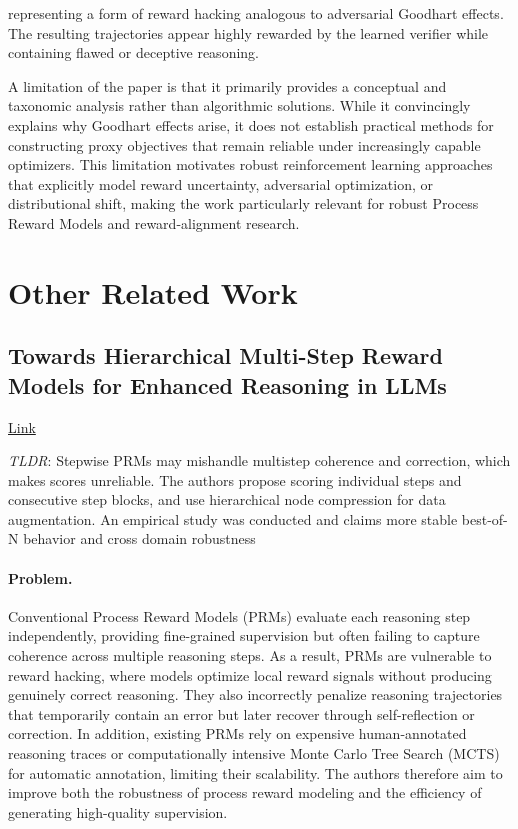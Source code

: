 \documentclass[11pt]{article}
\begin{document}
representing a form of reward hacking analogous to adversarial Goodhart effects. The resulting trajectories appear highly rewarded by the learned verifier while containing flawed or deceptive reasoning.

A limitation of the paper is that it primarily provides a conceptual and taxonomic analysis rather than algorithmic solutions. While it convincingly explains why Goodhart effects arise, it does not establish practical methods for constructing proxy objectives that remain reliable under increasingly capable optimizers. This limitation motivates robust reinforcement learning approaches that explicitly model reward uncertainty, adversarial optimization, or distributional shift, making the work particularly relevant for robust Process Reward Models and reward-alignment research.


\newpage
\section{Other Related Work}

\subsection{Towards Hierarchical Multi-Step Reward Models for Enhanced Reasoning in LLMs}

\href{https://arxiv.org/abs/2503.13551}{Link}

\emph{TLDR}: Stepwise PRMs may mishandle multistep coherence and correction, which makes scores unreliable. The authors propose scoring individual steps and consecutive step blocks, and use hierarchical node compression for data augmentation. An empirical study was conducted and claims more stable best-of-N behavior and cross domain robustness

\paragraph{Problem.}
Conventional Process Reward Models (PRMs) evaluate each reasoning step independently, providing fine-grained supervision but often failing to capture coherence across multiple reasoning steps. As a result, PRMs are vulnerable to reward hacking, where models optimize local reward signals without producing genuinely correct reasoning. They also incorrectly penalize reasoning trajectories that temporarily contain an error but later recover through self-reflection or correction. In addition, existing PRMs rely on expensive human-annotated reasoning traces or computationally intensive Monte Carlo Tree Search (MCTS) for automatic annotation, limiting their scalability. The authors therefore aim to improve both the robustness of process reward modeling and the efficiency of generating high-quality supervision.  
\end{document}
